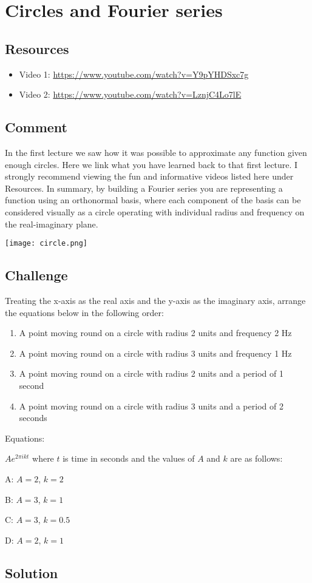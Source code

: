 \section{Circles and Fourier series}

\subsection*{Resources}
\begin{itemize}
    \item Video 1: \url{https://www.youtube.com/watch?v=Y9pYHDSxc7g}
    \item Video 2: \url{https://www.youtube.com/watch?v=LznjC4Lo7lE}
\end{itemize}

\subsection*{Comment}
In the first lecture we saw how it was possible to approximate any function given enough circles. Here we link what you have learned back to that first lecture. I strongly recommend viewing the fun and informative videos listed here under Resources. In summary, by building a Fourier series you are representing a function using an orthonormal basis, where each component of the basis can be considered visually as a circle operating with individual radius and frequency on the real-imaginary plane.

\texttt{[image: circle.png]}

\subsection*{Challenge}
Treating the x-axis as the real axis and the y-axis as the imaginary axis, arrange the equations below in the following order:

\begin{enumerate}
    \item A point moving round on a circle with radius 2 units and frequency 2 Hz
    \item A point moving round on a circle with radius 3 units and frequency 1 Hz
    \item A point moving round on a circle with radius 2 units and a period of 1 second
    \item A point moving round on a circle with radius 3 units and a period of 2 seconds
\end{enumerate}

Equations:

$\displaystyle A e^{2 \pi i k t}$ where $t$ is time in seconds and the values of $A$ and $k$ are as follows:

A: $A=2$, $k=2$ 

B: $A=3$, $k=1$

C: $A=3$, $k=0.5$

D: $A=2$, $k=1$

\subsection*{Solution}






\fi
